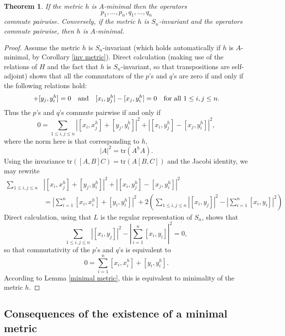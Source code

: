 \documentclass[12pt, reqno]{amsart}
\numberwithin{equation}{section}
\theoremstyle{definition}
\theoremstyle{plain}
\newtheorem{theorem}{Theorem}[section]
\begin{document}
\begin{theorem}
If the metric $h$ is $A$-minimal then the operators $$p_1,\dots,p_n,q_1,\dots,q_n$$ commute pairwise. Conversely, if the metric $h$ is $S_n$-invariant and the operators commute pairwise, then $h$ is $A$-minimal.
\end{theorem}

\begin{proof}
Assume the metric $h$ is $S_n$-invariant (which holds automatically if $h$ is $A$-minimal, by Corollary \ref{inv metric}). Direct calculation (making use of the relations of $H$ and the fact that $h$ is $S_n$-invariant, so that transpositions are self-adjoint) shows that all the commutators of the $p$'s and $q$'s are zero if and only if the following relations hold:
\begin{equation}
[x_i,x_j^h]+[y_j,y_i^h]=0 \quad \text{and} \quad [x_i,y_j^h]-[x_j,y_i^h]=0 \quad \hbox{for all $1 \leq i,j \leq n$.}
\end{equation} Thus the $p$'s and $q$'s commute pairwise if and only if
$$0=\sum_{1 \leq i,j \leq n} \left| [x_i,x_j^h]+[y_j,y_i^h] \right|^2+\left|  [x_i,y_j^h]-[x_j,y_i^h] \right|^2,$$ where the norm here is that corresponding to $h$, 
$$|A|^2=\mathrm{tr}(A^h A).$$ Using the invariance $\mathrm{tr}([A,B]C)=\mathrm{tr}(A[B,C])$ and the Jacobi identity, we may rewrite
\begin{align*}
\sum_{1 \leq i,j \leq n} & \left| [x_i,x_j^h]+[y_j,y_i^h] \right|^2+\left|  [x_i,y_j^h]-[x_j,y_i^h] \right|^2 \\ 
&=\left| \sum_{i=1}^n [x_i,x_i^h]+[y_i,y_i^h] \right|^2+2 \left( \sum_{1 \leq i,j \leq n} \left| [x_i,y_j] \right|^2-\left| \sum_{i=1}^n [x_i,y_i] \right|^2 \right)
\end{align*}
Direct calculation, using that $L$ is the regular representation of $S_n$, shows that
$$\sum_{1 \leq i,j \leq n} \left| [x_i,y_j] \right|^2-\left| \sum_{i=1}^n [x_i,y_i] \right|^2=0,$$ so that commutativity of the $p$'s and $q$'s is equivalent to
$$0=\sum_{i=1}^n [x_i,x_i^h]+[y_i,y_i^h].$$ According to Lemma \ref{minimal metric}, this is equivalent to minimality of the metric $h$.
\end{proof}

\subsection{Consequences of the existence of a minimal metric}
\end{document}
